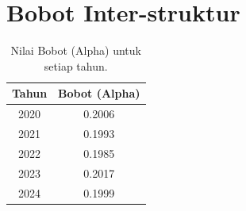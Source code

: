 \section*{Bobot Inter-struktur}
\begin{table}[H]
\centering
\caption{Nilai Bobot (Alpha) untuk setiap tahun.} \label{tab:alpha}
\begin{tabular}{|c|c|}
\hline
\textbf{Tahun} & \textbf{Bobot (Alpha)} \\
\hline
2020 & 0.2006 \\
2021 & 0.1993 \\
2022 & 0.1985 \\
2023 & 0.2017 \\
2024 & 0.1999 \\
\hline
\end{tabular}
\end{table}
\vspace{0.5cm}
